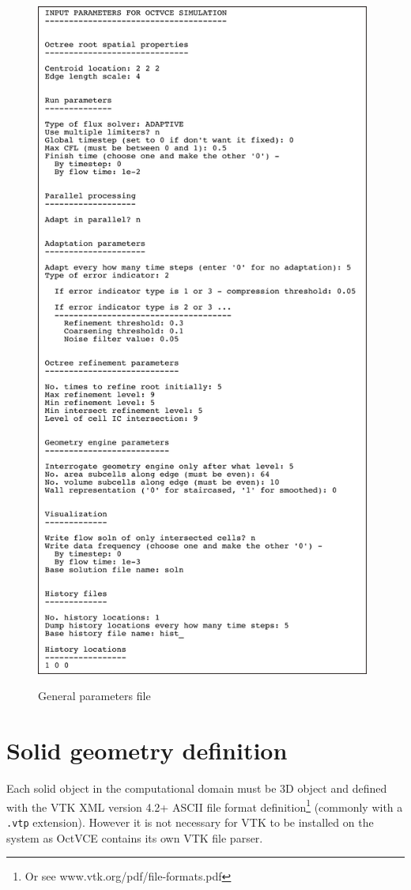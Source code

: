 \documentclass[pdftex, 12pt, a4paper]{report}
\begin{document}
\begin{figure}[htp]
\centering
\includegraphics[width=11cm]{pics/ov_par_template.jpg}
\label{fig:ov.par}
\caption{General parameters file}
\end{figure}

\pagebreak

\section{Solid geometry definition}\label{sec:geom}

Each solid object in the computational domain must be 3D object and defined with the VTK XML version 4.2+ ASCII file 
format \cite{book:vtkmanual} definition\footnote{Or see www.vtk.org/pdf/file-formats.pdf} (commonly with a \verb'.vtp' 
extension).  However it is not necessary for VTK to be installed on the system as OctVCE contains its own VTK file parser.  
\end{document}
